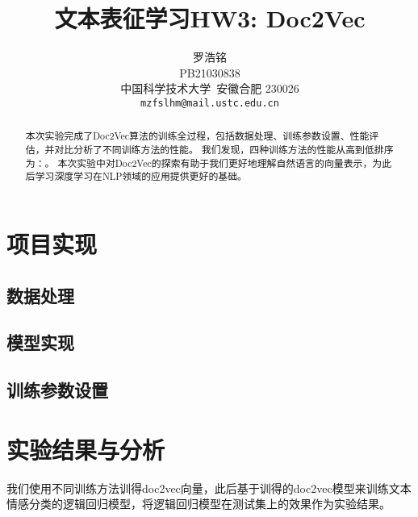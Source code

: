 \documentclass{article}
\title{文本表征学习HW3: Doc2Vec}
\author{
  罗浩铭 \\
  PB21030838\\
  中国科学技术大学\ 安徽合肥 230026 \\
  \texttt{mzfslhm@mail.ustc.edu.cn} \\
}
\begin{document}
\maketitle


\begin{abstract}
  本次实验完成了Doc2Vec算法的训练全过程，包括数据处理、训练参数设置、性能评估，并对比分析了不同训练方法的性能。
  我们发现，四种训练方法的性能从高到低排序为：。
  本次实验中对Doc2Vec的探索有助于我们更好地理解自然语言的向量表示，为此后学习深度学习在NLP领域的应用提供更好的基础。
\end{abstract}


\section{项目实现}
\subsection{数据处理}


\subsection{模型实现}


\subsection{训练参数设置}

\section{实验结果与分析}

我们使用不同训练方法训得doc2vec向量，此后基于训得的doc2vec模型来训练文本情感分类的逻辑回归模型，将逻辑回归模型在测试集上的效果作为实验结果。
\end{document}
